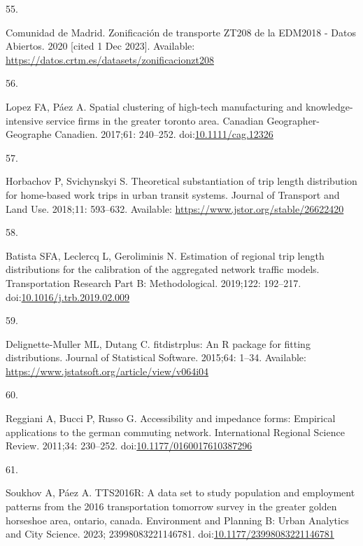 \documentclass[10pt,letterpaper]{article}
\newlength{\cslhangindent}
\newlength{\csllabelwidth}
\newlength{\cslentryspacingunit} %
\newenvironment{CSLReferences}[2] %
 {%
  \setlength{\parindent}{0pt}
  \ifodd #1
  \let\oldpar\par
  \def\par{\hangindent=\cslhangindent\oldpar}
  \fi
  \setlength{\parskip}{#2\cslentryspacingunit}
 }%
 {}
\newcommand{\CSLLeftMargin}[1]{\parbox[t]{\csllabelwidth}{#1}}
\newcommand{\CSLRightInline}[1]{\parbox[t]{\linewidth - \csllabelwidth}{#1}\break}
\begin{document}
\begin{CSLReferences}{0}{0}
\leavevmode{}%
\CSLLeftMargin{55. }%
\CSLRightInline{Comunidad de Madrid. Zonificación de transporte ZT208 de
la EDM2018 - Datos Abiertos. 2020 {[}cited 1 Dec 2023{]}. Available:
\url{https://datos.crtm.es/datasets/zonificacionzt208}}

\leavevmode{}%
\CSLLeftMargin{56. }%
\CSLRightInline{Lopez FA, Páez A. Spatial clustering of high-tech
manufacturing and knowledge-intensive service firms in the greater
toronto area. Canadian Geographer-Geographe Canadien. 2017;61: 240--252.
doi:\href{https://doi.org/10.1111/cag.12326}{10.1111/cag.12326}}

\leavevmode{}%
\CSLLeftMargin{57. }%
\CSLRightInline{Horbachov P, Svichynskyi S. Theoretical substantiation
of trip length distribution for home-based work trips in urban transit
systems. Journal of Transport and Land Use. 2018;11: 593--632.
Available: \url{https://www.jstor.org/stable/26622420}}

\leavevmode{}%
\CSLLeftMargin{58. }%
\CSLRightInline{Batista SFA, Leclercq L, Geroliminis N. Estimation of
regional trip length distributions for the calibration of the aggregated
network traffic models. Transportation Research Part B: Methodological.
2019;122: 192--217.
doi:\href{https://doi.org/10.1016/j.trb.2019.02.009}{10.1016/j.trb.2019.02.009}}

\leavevmode{}%
\CSLLeftMargin{59. }%
\CSLRightInline{Delignette-Muller ML, Dutang C. {fitdistrplus}: An {R}
package for fitting distributions. Journal of Statistical Software.
2015;64: 1--34. Available:
\url{https://www.jstatsoft.org/article/view/v064i04}}

\leavevmode{}%
\CSLLeftMargin{60. }%
\CSLRightInline{Reggiani A, Bucci P, Russo G. Accessibility and
impedance forms: Empirical applications to the german commuting network.
International Regional Science Review. 2011;34: 230--252.
doi:\href{https://doi.org/10.1177/0160017610387296}{10.1177/0160017610387296}}

\leavevmode{}%
\CSLLeftMargin{61. }%
\CSLRightInline{Soukhov A, Páez A. {TTS}2016R: A data set to study
population and employment patterns from the 2016 transportation tomorrow
survey in the greater golden horseshoe area, ontario, canada.
Environment and Planning B: Urban Analytics and City Science. 2023;
23998083221146781.
doi:\href{https://doi.org/10.1177/23998083221146781}{10.1177/23998083221146781}}


\end{CSLReferences}
\end{document}
